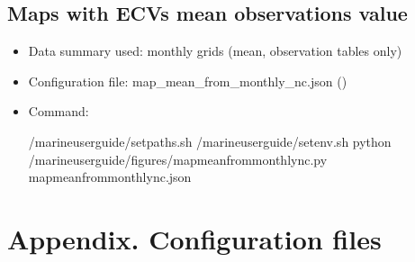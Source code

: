 \documentclass[letterpaper,10pt,english]{sphinxmanual}
\begin{document}
\section{Maps with ECVs mean observations value}
\label{\detokenize{index:maps-with-ecvs-mean-observations-value}}\begin{itemize}
\item {} 
Data summary used: monthly grids (mean, observation tables only)

\item {} 
Configuration file: map\_mean\_from\_monthly\_nc.json ({\hyperref[\detokenize{index:map-mean-config}]{}})

\item {} 
Command:

\begin{sphinxVerbatim}[commandchars=\\\{\}]
 /marine\PYGZhy{}user\PYGZhy{}guide/setpaths.sh
 /marine\PYGZhy{}user\PYGZhy{}guide/setenv.sh
python /marine\PYGZhy{}user\PYGZhy{}guide/figures/map\PYGZus{}mean\PYGZus{}from\PYGZus{}monthly\PYGZus{}nc.py map\PYGZus{}mean\PYGZus{}from\PYGZus{}monthly\PYGZus{}nc.json
\end{sphinxVerbatim}

\end{itemize}


\chapter{Appendix. Configuration files}
\label{\detokenize{index:appendix-configuration-files}}\label{\detokenize{index:appendix}}
\end{document}
